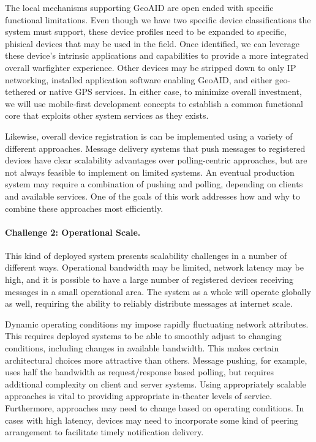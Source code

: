 \documentclass{sbir}
\begin{document}
The local mechanisms supporting GeoAID are open ended with specific functional limitations.  Even though we have two specific device classifications the system must support, these device profiles need to be expanded to specific, phisical devices that may be used in the field.  Once identified, we can leverage these device's intrinsic applications and capabilities to provide a more integrated overall warfighter experience.  Other devices may be stripped down to only IP networking, installed application software enabling GeoAID, and either geo-tethered or native GPS services.  In either case, to minimize overall investment, we will use mobile-first development concepts to establish a common functional core that exploits other system services as they exists.

Likewise, overall device registration is can be implemented using a variety of different approaches.  Message delivery systems that push messages to registered devices have clear scalability advantages over polling-centric approaches, but are not always feasible to implement on limited systems.  An eventual production system may require a combination of pushing and polling, depending on clients and available services.  One of the goals of this work addresses how and why to combine these approaches most efficiently.

\paragraph{Challenge 2: Operational Scale.}  This kind of deployed system presents scalability challenges in a number of different ways.  Operational bandwidth may be limited, network latency may be high, and it is possible to have a large number of registered devices receiving messages in a small operational area.  The system as a whole will operate globally as well, requiring the ability to reliably distribute messages at internet scale.

Dynamic operating conditions my impose rapidly fluctuating network attributes.  This requires deployed systems to be able to smoothly adjust to changing conditions, including changes in available bandwidth.  This makes certain architectural choices more attractive than others.  Message pushing, for example, uses half the bandwidth as request/response based polling, but requires additional complexity on client and server systems.  Using appropriately scalable approaches is vital to providing appropriate in-theater levels of service.  Furthermore, approaches may need to change based on operating conditions.  In cases with high latency, devices may need to incorporate some kind of peering arrangement to facilitate timely notification delivery.
\end{document}
